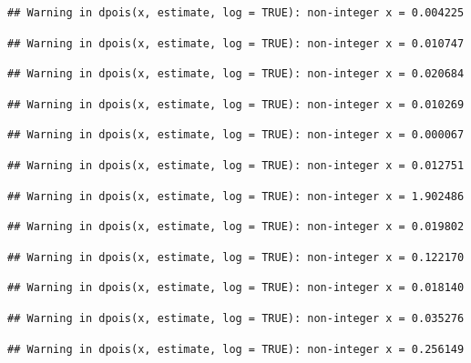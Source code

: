 \documentclass[]{article}
\begin{document}
\begin{verbatim}
## Warning in dpois(x, estimate, log = TRUE): non-integer x = 0.004225
\end{verbatim}

\begin{verbatim}
## Warning in dpois(x, estimate, log = TRUE): non-integer x = 0.010747
\end{verbatim}

\begin{verbatim}
## Warning in dpois(x, estimate, log = TRUE): non-integer x = 0.020684
\end{verbatim}

\begin{verbatim}
## Warning in dpois(x, estimate, log = TRUE): non-integer x = 0.010269
\end{verbatim}

\begin{verbatim}
## Warning in dpois(x, estimate, log = TRUE): non-integer x = 0.000067
\end{verbatim}

\begin{verbatim}
## Warning in dpois(x, estimate, log = TRUE): non-integer x = 0.012751
\end{verbatim}

\begin{verbatim}
## Warning in dpois(x, estimate, log = TRUE): non-integer x = 1.902486
\end{verbatim}

\begin{verbatim}
## Warning in dpois(x, estimate, log = TRUE): non-integer x = 0.019802
\end{verbatim}

\begin{verbatim}
## Warning in dpois(x, estimate, log = TRUE): non-integer x = 0.122170
\end{verbatim}

\begin{verbatim}
## Warning in dpois(x, estimate, log = TRUE): non-integer x = 0.018140
\end{verbatim}

\begin{verbatim}
## Warning in dpois(x, estimate, log = TRUE): non-integer x = 0.035276
\end{verbatim}

\begin{verbatim}
## Warning in dpois(x, estimate, log = TRUE): non-integer x = 0.256149
\end{verbatim}
\end{document}

